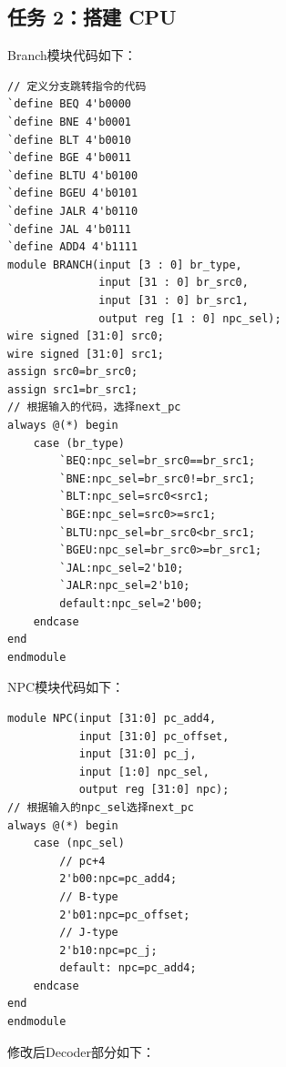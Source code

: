\documentclass[12pt,a4paper]{ctexart}
\begin{document}
\subsection{任务 2：搭建 CPU}
Branch模块代码如下：
\begin{lstlisting}[style=verilog]
// 定义分支跳转指令的代码
`define BEQ 4'b0000
`define BNE 4'b0001
`define BLT 4'b0010
`define BGE 4'b0011
`define BLTU 4'b0100
`define BGEU 4'b0101
`define JALR 4'b0110
`define JAL 4'b0111
`define ADD4 4'b1111
module BRANCH(input [3 : 0] br_type,
              input [31 : 0] br_src0,
              input [31 : 0] br_src1,
              output reg [1 : 0] npc_sel);
wire signed [31:0] src0;
wire signed [31:0] src1;
assign src0=br_src0;
assign src1=br_src1;
// 根据输入的代码，选择next_pc
always @(*) begin
    case (br_type)
        `BEQ:npc_sel=br_src0==br_src1;
        `BNE:npc_sel=br_src0!=br_src1;
        `BLT:npc_sel=src0<src1;
        `BGE:npc_sel=src0>=src1;
        `BLTU:npc_sel=br_src0<br_src1;
        `BGEU:npc_sel=br_src0>=br_src1; 
        `JAL:npc_sel=2'b10;
        `JALR:npc_sel=2'b10;
        default:npc_sel=2'b00;
    endcase
end
endmodule
\end{lstlisting}\par
NPC模块代码如下：
\begin{lstlisting}[style=verilog]
module NPC(input [31:0] pc_add4,
           input [31:0] pc_offset,
           input [31:0] pc_j,
           input [1:0] npc_sel,
           output reg [31:0] npc);
// 根据输入的npc_sel选择next_pc
always @(*) begin
    case (npc_sel)
        // pc+4
        2'b00:npc=pc_add4;
        // B-type
        2'b01:npc=pc_offset;
        // J-type
        2'b10:npc=pc_j; 
        default: npc=pc_add4;
    endcase
end
endmodule
\end{lstlisting}\par
修改后Decoder部分如下：
\end{document}
